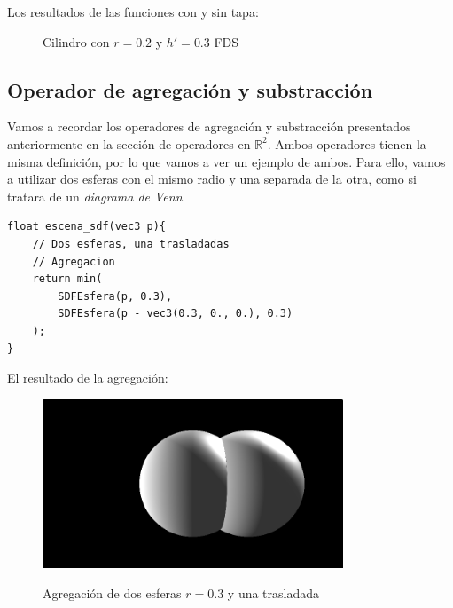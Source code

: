 Los resultados de las funciones con y sin tapa:

\begin{figure}[H]
  \centering
  \captionsetup{justification=centering}%
  \hfill
  \caption{Cilindro con \(r=0.2\) y \(h'=0.3\)  FDS}
\end{figure}

\subsection{Operador de agregación y substracción}
Vamos a recordar los operadores de agregación y substracción presentados anteriormente en la sección de operadores en \(\mathbb{R}^2\). Ambos operadores tienen la misma definición, por lo que vamos a ver un ejemplo de ambos. Para ello, vamos a utilizar dos esferas con el mismo radio y una separada de la otra, como si tratara de un \textit{diagrama de Venn}.
\begin{lstlisting}
float escena_sdf(vec3 p){
    // Dos esferas, una trasladadas
    // Agregacion
    return min(
        SDFEsfera(p, 0.3),
        SDFEsfera(p - vec3(0.3, 0., 0.), 0.3)
    );
}
\end{lstlisting}
El resultado de la agregación:
\begin{figure}[H]
  \centering
  \captionsetup{justification=centering}%
  \includegraphics[width=0.8\textwidth]{secciones/imagenes/sdf/3d/sdf_add_3d.png}\label{fig:add3d}
  \caption{Agregación de dos esferas \(r=0.3\) y una trasladada}
\end{figure}

